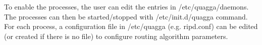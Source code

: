 To enable the processes, the user can edit the entries in /etc/quagga/daemons. \\
The processes can then be started/stopped with /etc/init.d/quagga {command}.
For each process, a configuration file in /etc/quagga (e.g. ripd.conf) can be edited (or created if there is no file) to configure routing algorithm parameters.
